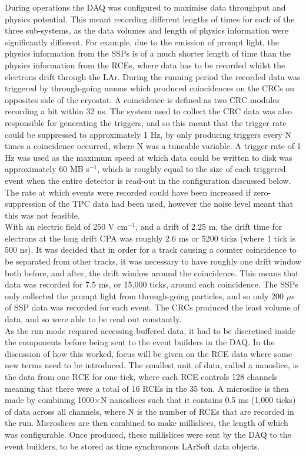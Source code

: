 During operations the DAQ was configured to maximise data throughput and physics potential. This meant recording different lengths of times for each of the three sub-systems, as the data volumes and length of physics information were significantly different. For example, due to the emission of prompt light, the physics information from the SSPs is of a much shorter length of time than the physics information from the RCEs, where data has to be recorded whilst the electrons drift through the LAr. During the running period the recorded data was triggered by through-going muons which produced coincidences on the CRCs on opposites side of the cryostat. A coincidence is defined as two CRC modules recording a hit within 32 ns. The system used to collect the CRC data was also responsible for generating the triggers, and so this meant that the trigger rate could be suppressed to approximately 1 Hz, by only producing triggers every N times a coincidence occurred, where N was a tuneable variable. A trigger rate of 1 Hz was used as the maximum speed at which data could be written to disk was approximately 60 MB s$^{-1}$, which is roughly equal to the size of each triggered event when the entire detector is read-out in the configuration discussed below. The rate at which events were recorded could have been increased if zero-suppression of the TPC data had been used, however the noise level meant that this was not feasible. \\ 

With an electric field of 250 V cm$^{-1}$, and a drift of 2.25 m, the drift time for electrons at the long drift CPA was roughly 2.6 ms or 5200 ticks (where 1 tick is 500 ns). It was decided that in order for a track causing a counter coincidence to be separated from other tracks, it was necessary to have roughly one drift window both before, and after, the drift window around the coincidence. This means that data was recorded for 7.5 ms, or 15,000 ticks, around each coincidence. The SSPs only collected the prompt light from through-going particles, and so only 200 $\mu$s of SSP data was recorded for each event. The CRCs produced the least volume of data, and so were able to be read out constantly. \\

As the run mode required accessing buffered data, it had to be discretised inside the components before being sent to the event builders in the DAQ. In the discussion of how this worked, focus will be given on the RCE data where some new terms need to be introduced. The smallest unit of data, called a nanoslice, is the data from one RCE for one tick, where each RCE controls 128 channels meaning that there were a total of 16 RCEs in the 35 ton. A microslice is then made by combining 1000$\times$N nanoslices such that it contains 0.5 ms (1,000 ticks) of data across all channels, where N is the number of RCEs that are recorded in the run. Microslices are then combined to make millislices, the length of which was configurable. Once produced, these millislices were sent by the DAQ to the event builders, to be stored as time synchronous LArSoft data objects. \\

